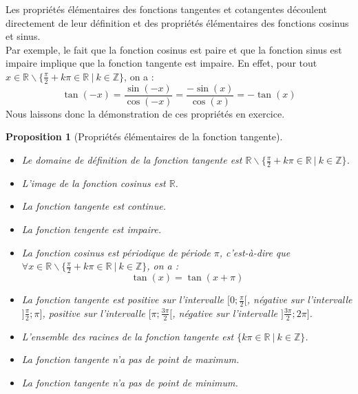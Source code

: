 \documentclass[a4paper,fontsize=13pt]{scrreprt}
\theoremstyle{plain}
\newtheorem{pro}[subsection]{Proposition}
\theoremstyle{definition}
\newcommand{\zz}{\mathbb{Z}}
\newcommand{\rr}{\mathbb{R}}
\begin{document}
Les propriétés élémentaires des fonctions tangentes et cotangentes découlent directement de leur définition et des propriétés élémentaires des fonctions cosinus et sinus. \\
Par exemple, le fait que la fonction cosinus est paire et que la fonction sinus est impaire implique que la fonction tangente est impaire. En effet, pour tout $x \in \rr \backslash \{\frac{\pi}{2}+k\pi \in \rr ~|~k \in \zz\}$, on a :
$$\tan(-x) = \frac{\sin(-x)}{\cos(-x)} =\frac{-\sin(x)}{\cos(x)} = - \tan(x)$$
Nous laissons donc la démonstration de ces propriétés en exercice.
\begin{pro} [Propriétés élémentaires de la fonction tangente] ~\\
\begin{itemize}
\item Le domaine de définition de la fonction tangente est $\rr \backslash \{\frac{\pi}{2}+k\pi \in \rr ~|~k \in \zz\}$.
\item L'image de la fonction cosinus est $\rr$.
\item La fonction tangente est continue.
\item La fonction tengente est impaire.
\item La fonction cosinus est périodique de période $\pi$, c'est-à-dire que \\$\forall x \in \rr \backslash \{\frac{\pi}{2}+k\pi \in \rr ~|~k \in \zz\}$, on a : $$\tan(x) = \tan(x+\pi)$$
\item La fonction tangente est positive sur l'intervalle $[0;\frac{\pi}{2}[$, négative sur l'intervalle $]\frac{\pi}{2};\pi]$, positive sur l'intervalle $[\pi;\frac{3\pi}{2}[$, négative sur l'intervalle $]\frac{3\pi}{2};2\pi]$.
\item L'ensemble des racines de la fonction tangente est $\{k\pi \in \rr~|~k \in \zz \}$.
\item La fonction tangente n'a pas de point de maximum.
\item La fonction tangente n'a pas de point de minimum.
\end{itemize}
\end{pro}
\end{document}
